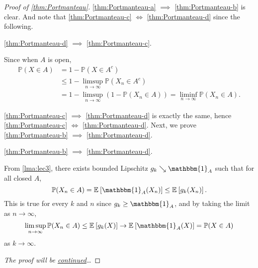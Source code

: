 \begin{proof}[Proof of \autoref{thm:Portmanteau}]\let\qed\relax
	\autoref{thm:Portmanteau-a} \(\implies \) \autoref{thm:Portmanteau-b} is clear. And note that \autoref{thm:Portmanteau-c} \(\iff \) \autoref{thm:Portmanteau-d} since the following.
	\begin{claim}
		\autoref{thm:Portmanteau-d} \(\implies \) \autoref{thm:Portmanteau-c}.
	\end{claim}
	\begin{explanation}
		Since when \(A\) is open,
		\[
			\begin{split}
				\mathbb{P} (X \in A)
				 & = 1 - \mathbb{P} (X \in A^{c} )                                         \\
				 & \leq 1 - \limsup_{n \to \infty} \mathbb{P} (X_n \in A^{c} )             \\
				 & = 1 - \limsup_{n \to \infty} \left( 1 - \mathbb{P} (X_n \in A ) \right)
				= \liminf_{n \to \infty} \mathbb{P} (X_n \in A).
			\end{split}
		\]
	\end{explanation}
	\autoref{thm:Portmanteau-c} \(\implies \) \autoref{thm:Portmanteau-d} is exactly the same, hence \autoref{thm:Portmanteau-c} \(\iff \) \autoref{thm:Portmanteau-d}. Next, we prove \autoref{thm:Portmanteau-b} \(\implies \) \autoref{thm:Portmanteau-d}.

	\begin{claim}
		\autoref{thm:Portmanteau-b} \(\implies \) \autoref{thm:Portmanteau-d}.
	\end{claim}
	\begin{explanation}
		From \autoref{lma:lec3}, there exists bounded Lipschitz \(g_k \searrow \mathbbm{1}_{A} \) such that for all closed \(A\),
		\[
			\mathbb{P} (X_n \in A)
			= \mathbb{E}_{}\left[\mathbbm{1}_{A} (X_n) \right]
			\leq \mathbb{E}_{}\left[g_k(X_n) \right].
		\]
		This is true for every \(k\) and \(n\) since \(g_k \geq \mathbbm{1}_{A} \), and by taking the limit as \(n \to \infty \),
		\[
			\limsup_{n \to \infty} \mathbb{P} (X_n \in A)
			\leq \mathbb{E}_{}\left[g_k(X) \right]
			\to \mathbb{E}_{}\left[\mathbbm{1}_{A} (X) \right]
			= \mathbb{P} (X \in A)
		\]
		as \(k \to \infty \).
	\end{explanation}
	\emph{The proof will be \hyperref[pf:thm:Portmanteau-cont]{continued}\dots}
\end{proof}